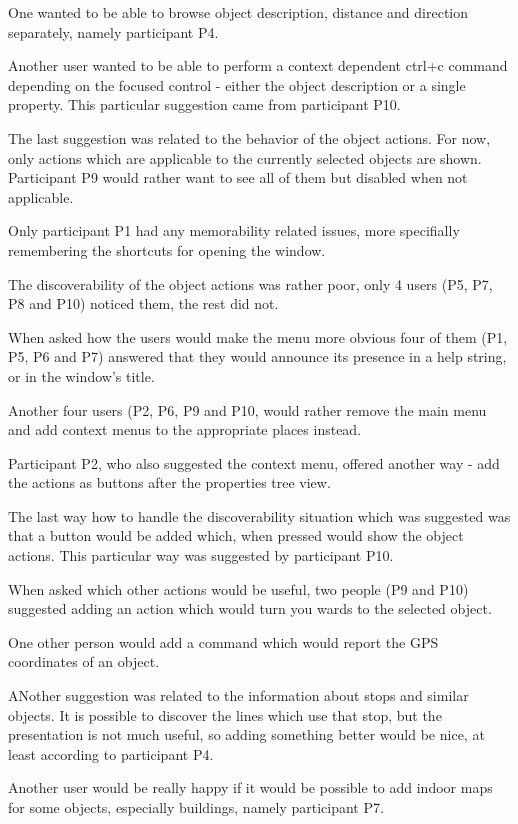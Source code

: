 \documentclass[nolof,digital]{fithesis3}
\begin{document}
One wanted to be able to browse object description, distance and direction separately, namely participant P4.

Another user wanted to be able to perform a context dependent ctrl+c command depending on the focused control - either the object description or a single property. This particular suggestion came from participant P10.

The last suggestion was related to the behavior of the object actions. For now, only actions which are applicable to the currently selected objects are shown. Participant P9 would rather want to see all of them but disabled when not applicable.

Only participant P1 had any memorability related issues, more specifially remembering the shortcuts for opening the window.

The discoverability of the object actions was rather poor, only 4 users (P5, P7, P8 and P10) noticed them, the rest did not.

When asked how the users would make the menu more obvious four of them (P1, P5, P6 and P7) answered that they would announce its presence in a help string, or in the window's title.

Another four users (P2, P6, P9 and P10, would rather remove the main menu and add context menus to the appropriate places instead.

Participant P2, who also suggested the context menu, offered another way - add the actions as buttons after the properties tree view.

The last way how to handle the discoverability situation which was suggested was that a button would be added which, when pressed would show the object actions. This particular way was suggested by participant P10.

When asked which other actions would be useful, two people (P9 and P10) suggested adding an action which would turn you wards to the selected object.

One other person would add a command which would report the GPS coordinates of an object.

ANother suggestion was related to the information about stops and similar objects. It is possible to discover the lines which use that stop, but the presentation is not much useful, so adding something better would be nice, at least according to participant P4.

Another user would be really happy if it would be possible to add indoor maps for some objects, especially buildings, namely participant P7.
\end{document}
